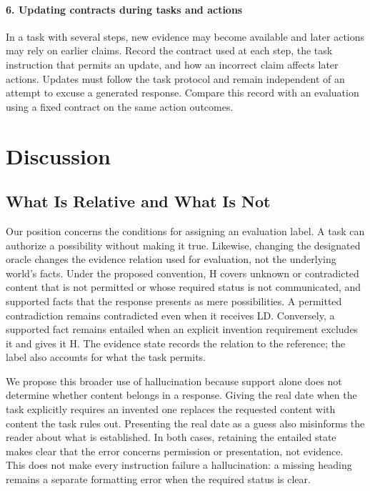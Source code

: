 \documentclass{clv2025}
\begin{document}
\paragraph{6. Updating contracts during tasks and actions}
In a task with several steps, new evidence may become available and later
actions may rely on earlier claims. Record the contract used at each step,
the task instruction that permits an update, and how an incorrect claim
affects later actions. Updates must follow the task protocol and remain
independent of an attempt to excuse a generated response. Compare this
record with an evaluation using a fixed contract on the same action outcomes.

\section{Discussion}\label{sec:discussion}

\subsection{What Is Relative and What Is Not}\label{subsec:relative}

Our position concerns the conditions for assigning an evaluation label.
A task can authorize a possibility without making it true. Likewise,
changing the designated oracle changes the evidence relation used for
evaluation, not the underlying world's facts. Under the proposed convention,
H covers unknown or contradicted content that is not permitted or whose
required status is not communicated, and supported facts that the response
presents as mere possibilities. A permitted contradiction remains
contradicted even when it receives LD. Conversely, a supported fact remains
entailed when an explicit invention requirement excludes it and gives it H.
The evidence state records the relation to the reference; the label also
accounts for what the task permits.

We propose this broader use of hallucination because support alone does
not determine whether content belongs in a response. Giving the real date
when the task explicitly requires an invented one replaces the requested
content with content the task rules out. Presenting the real date as a
guess also misinforms the reader about what is established. In both cases,
retaining the entailed state makes clear that the error concerns permission
or presentation, not evidence. This does
not make every instruction failure a hallucination: a missing heading
remains a separate formatting error when the required status is clear.
\end{document}
